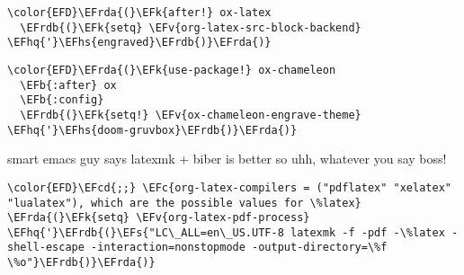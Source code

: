 \documentclass{article}
\newcommand{\EFc}[1]{\textcolor{EFc}{#1}} %
\newcommand{\EFcd}[1]{\textcolor{EFcd}{#1}} %
\newcommand{\EFs}[1]{\textcolor{EFs}{#1}} %
\newcommand{\EFk}[1]{\textcolor{EFk}{#1}} %
\newcommand{\EFb}[1]{\textcolor{EFb}{#1}} %
\newcommand{\EFv}[1]{\textcolor{EFv}{#1}} %
\newcommand{\EFhq}[1]{#1} %
\newcommand{\EFhs}[1]{\textcolor{EFhs}{#1}} %
\newcommand{\EFrda}[1]{\textcolor{EFrda}{#1}} %
\newcommand{\EFrdb}[1]{\textcolor{EFrdb}{#1}} %
\begin{document}
\begin{Code}
\begin{Verbatim}
\color{EFD}\EFrda{(}\EFk{after!} ox-latex
  \EFrdb{(}\EFk{setq} \EFv{org-latex-src-block-backend} \EFhq{'}\EFhs{engraved}\EFrdb{)}\EFrda{)}
\end{Verbatim}
\end{Code}


\begin{Code}
\begin{Verbatim}
\color{EFD}\EFrda{(}\EFk{use-package!} ox-chameleon
  \EFb{:after} ox
  \EFb{:config}
  \EFrdb{(}\EFk{setq!} \EFv{ox-chameleon-engrave-theme} \EFhq{'}\EFhs{doom-gruvbox}\EFrdb{)}\EFrda{)}
\end{Verbatim}
\end{Code}

smart emacs guy says latexmk + biber is better so uhh, whatever you say boss!
\begin{Code}
\begin{Verbatim}
\color{EFD}\EFcd{;;} \EFc{org-latex-compilers = ("pdflatex" "xelatex" "lualatex"), which are the possible values for \%latex}
\EFrda{(}\EFk{setq} \EFv{org-latex-pdf-process} \EFhq{'}\EFrdb{(}\EFs{"LC\_ALL=en\_US.UTF-8 latexmk -f -pdf -\%latex -shell-escape -interaction=nonstopmode -output-directory=\%f \%o"}\EFrdb{)}\EFrda{)}
\end{Verbatim}
\end{Code}
\end{document}
